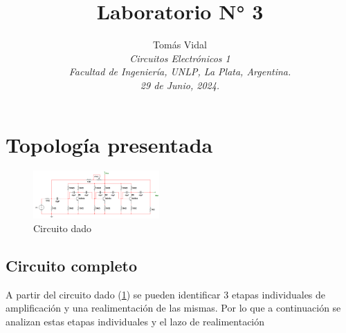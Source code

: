 \documentclass[letterpaper, 10 pt, conference]{ieeeconf}  %
\title{\LARGE \bf Laboratorio N° 3}
\author{
  Tom\'as Vidal\\
  {\it Circuitos Electrónicos 1}\\
  {\it Facultad de Ingenier\'ia, UNLP, La Plata, Argentina.}\\
  {\it 29 de Junio, 2024.}
}                                            %
\begin{document}
\maketitle
\thispagestyle{empty}
\pagestyle{empty}


\section{Topología presentada}
\begin{figure}[H]
 \centering
 \includegraphics[width=0.43\textwidth]{./Imagenes/circuito_completo.png}
 \caption{Circuito dado}
 \label{pic:circuito_completo}
\end{figure}
\subsection{Circuito completo}
A partir del circuito dado (\ref{pic:circuito_completo}) se pueden identificar 3 etapas individuales de amplificación y una realimentación de las mismas. Por lo que a continuación se analizan estas etapas individuales y el lazo de realimentación
\end{document}
